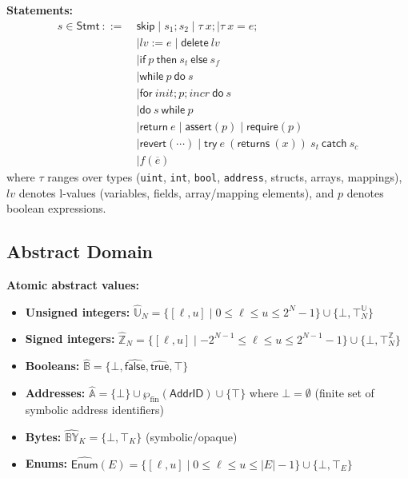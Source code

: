 \documentclass[pdflatex,sn-basic]{sn-jnl}%
\theoremstyle{thmstyleone}%
\theoremstyle{thmstyletwo}%
\theoremstyle{thmstylethree}%
\begin{document}
\noindent\textbf{Statements:}
\begin{align*}
s \in \mathsf{Stmt}\ ::=\ & \mathsf{skip} \mid s_1; s_2 \mid \tau\ x; \mid \tau\ x = e;\\
& \mid lv := e \mid \mathsf{delete}\ lv\\
& \mid \mathsf{if}\ p\ \mathsf{then}\ s_t\ \mathsf{else}\ s_f\\
& \mid \mathsf{while}\ p\ \mathsf{do}\ s\\
& \mid \mathsf{for}\ init; p; incr\ \mathsf{do}\ s\\
& \mid \mathsf{do}\ s\ \mathsf{while}\ p\\
& \mid \mathsf{return}\ e \mid \mathsf{assert}(p) \mid \mathsf{require}(p)\\
& \mid \mathsf{revert}(\cdots) \mid \mathsf{try}\ e\ (\mathsf{returns}\ (x))\ s_t\ \mathsf{catch}\ s_c\\
& \mid f(\overline{e})
\end{align*}
where $\tau$ ranges over types (\texttt{uint}, \texttt{int}, \texttt{bool}, \texttt{address}, structs, arrays, mappings), $lv$ denotes l-values (variables, fields, array/mapping elements), and $p$ denotes boolean expressions.

\subsection{Abstract Domain}

\noindent\textbf{Atomic abstract values:}
\begin{itemize}
\item \textbf{Unsigned integers:} $\widehat{\mathbb{U}}_N = \{[\ell,u] \mid 0 \le \ell \le u \le 2^N{-}1\} \cup \{\bot,\top^{\mathbb{U}}_N\}$
\item \textbf{Signed integers:} $\widehat{\mathbb{Z}}_N = \{[\ell,u] \mid -2^{N-1} \le \ell \le u \le 2^{N-1}{-}1\} \cup \{\bot,\top^{\mathbb{Z}}_N\}$
\item \textbf{Booleans:} $\widehat{\mathbb{B}} = \{\bot,\widehat{\mathsf{false}},\widehat{\mathsf{true}},\top\}$
\item \textbf{Addresses:} $\widehat{\mathbb{A}} = \{\bot\} \cup \wp_{\text{fin}}(\mathsf{AddrID}) \cup \{\top\}$ where $\bot = \emptyset$ (finite set of symbolic address identifiers)
\item \textbf{Bytes:} $\widehat{\mathbb{BY}}_K = \{\bot,\top_K\}$ (symbolic/opaque)
\item \textbf{Enums:} $\widehat{\mathsf{Enum}}(E) = \{[\ell,u]\mid 0\le \ell \le u \le |E|-1\}\cup\{\bot,\top_E\}$
\end{itemize}
\end{document}
